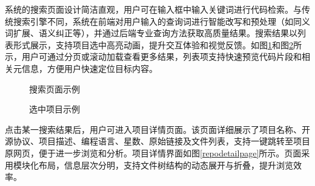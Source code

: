 \documentclass[UTF8,a4paper,12pt]{ctexart}
\numberwithin{equation}{section}
\begin{document}
系统的搜索页面设计简洁直观，用户可在输入框中输入关键词进行代码检索。与传统搜索引擎不同，系统在前端对用户输入的查询词进行智能改写和预处理（如同义词扩展、语义纠正等），并通过后端专业查询方法获取高质量结果。搜索结果以列表形式展示，支持项目选中高亮动画，提升交互体验和视觉反馈。如图\ref{searchpage}和图\ref{select}所示，用户可通过分页或滚动加载查看更多结果，列表项支持快速预览代码片段和相关元信息，方便用户快速定位目标内容。
\begin{figure}[H]
	\caption{搜索页面示例}
	\label{searchpage}
\end{figure}
\begin{figure}[H]
	\caption{选中项目示例}
	\label{select}
\end{figure}
点击某一搜索结果后，用户可进入项目详情页面。该页面详细展示了项目名称、开源协议、项目描述、编程语言、星数、原始链接及文件列表，支持一键跳转至项目原网页，便于进一步浏览和分析。项目详情界面如图\ref{repodetailpage}所示。页面采用模块化布局，信息层次分明，支持文件树结构的动态展开与折叠，提升浏览效率。
\end{document}
